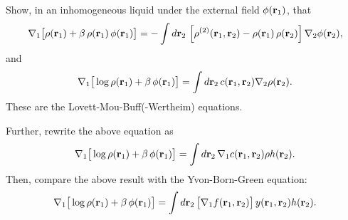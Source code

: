 \documentclass{book}
\begin{document}
%
%






Show, in an inhomogeneous liquid under the external field $\phi(\vr_1)$, that
%
\begin{align*}
  \nabla_1 \big[
    \rho(\vr_1)
  + \beta \, \rho(\vr_1) \, \phi(\vr_1)
\big]
  =
  -\int d \vr_2 \,
    \left[
      \rho^{(2)}(\vr_1, \vr_2) - \rho(\vr_1) \, \rho(\vr_2)
    \right]
    \nabla_2 \phi(\vr_2),
\end{align*}
%
and
%
\begin{align}
  \nabla_1 \big[
    \log \rho(\vr_1) + \beta \, \phi(\vr_1)
  \big]
   = \int d \vr_2 \,
    c(\vr_1, \vr_2)
    \nabla_2 \rho(\vr_2).
\end{align}
These are the Lovett-Mou-Buff(-Wertheim) equations\cite{lovett1976, wertheim1976}.




Further, rewrite the above equation as
%
\[
   \nabla_1
   \big[
     \log \rho(\vr_1) + \beta \, \phi(\vr_1)
   \big]
  =
 \int d \vr_2 \,
    \nabla_1 c(\vr_1, \vr_2)
    \rho h(\vr_2).
\]
%
Then, compare the above result with the Yvon-Born-Green equation:
%
\begin{align}
   \nabla_1
   \big[
     \log \rho(\vr_1) + \beta \, \phi(\vr_1)
   \big]
  =
 \int d \vr_2 \,
    \big[ \nabla_1 f(\vr_1, \vr_2) \big]
    \, y(\vr_1, \vr_2)
    h(\vr_2).
\end{align}
\end{document}
